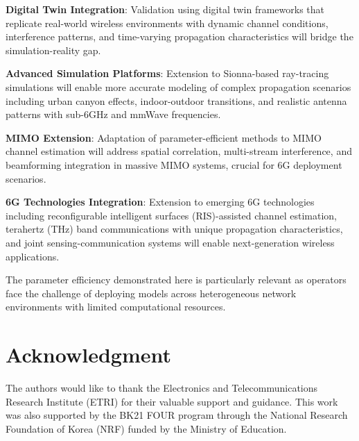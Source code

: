\documentclass[conference]{IEEEtran}
\begin{document}
\textbf{Digital Twin Integration}: Validation using digital twin frameworks that replicate real-world wireless environments with dynamic channel conditions, interference patterns, and time-varying propagation characteristics will bridge the simulation-reality gap.

\textbf{Advanced Simulation Platforms}: Extension to Sionna-based ray-tracing simulations will enable more accurate modeling of complex propagation scenarios including urban canyon effects, indoor-outdoor transitions, and realistic antenna patterns with sub-6GHz and mmWave frequencies.

\textbf{MIMO Extension}: Adaptation of parameter-efficient methods to MIMO channel estimation will address spatial correlation, multi-stream interference, and beamforming integration in massive MIMO systems, crucial for 6G deployment scenarios.

\textbf{6G Technologies Integration}: Extension to emerging 6G technologies including reconfigurable intelligent surfaces (RIS)-assisted channel estimation, terahertz (THz) band communications with unique propagation characteristics, and joint sensing-communication systems will enable next-generation wireless applications.

The parameter efficiency demonstrated here is particularly relevant as operators face the challenge of deploying models across heterogeneous network environments with limited computational resources.

\section*{Acknowledgment}

The authors would like to thank the Electronics and Telecommunications Research Institute (ETRI) for their valuable support and guidance. This work was also supported by the BK21 FOUR program through the National Research Foundation of Korea (NRF) funded by the Ministry of Education.



\end{document}
